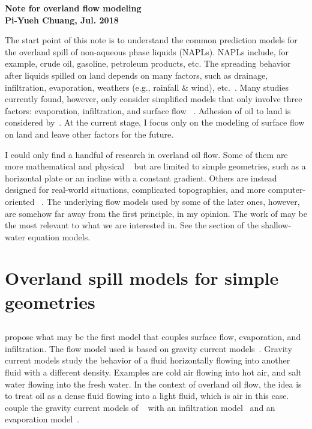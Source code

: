 \documentclass[letterpaper]{article}
\begin{document}
   \noindent           
   {\bf \Large Note for overland flow modeling}\\
   {\bf \normalsize Pi-Yueh Chuang, Jul. 2018}

The start point of this note is to understand the common prediction 
models for the overland spill of non-aqueous phase liquids (NAPLs). 
NAPLs include, for example, crude oil, gasoline, petroleum products, etc. 
The spreading behavior after liquids spilled on land depends on many factors, 
such as drainage, infiltration, evaporation, weathers (e.g., rainfall \& wind), 
etc.\ \cite{Simmons2003}.
Many studies currently found, however, only consider simplified models that only
involve three factors: evaporation, infiltration, and surface flow
\ \cite{Hussein2002, Ronnie2004, Zuczek2008}. 
Adhesion of oil to land is considered by\ \cite{Farrar2005}. 
At the current stage, I focus only on the modeling of surface flow on land and 
leave other factors for the future.

I could only find a handful of research in overland oil flow. 
Some of them are more mathematical and physical 
\ \cite{Hussein2002, Simmons2003, Guo2006} 
but are limited to simple geometries, such as a horizontal plate or an incline 
with a constant gradient. 
Others are instead designed for real-world situations, complicated topographies,
and more computer-oriented
\ \cite{Ronnie2004, Farrar2005, Zuczek2008, Gin2012, Su2017}.
The underlying flow models used by some of the later ones, however, are somehow 
far away from the first principle, in my opinion.
The work of \textcite{Su2017} may be the most relevant to what we are interested 
in. 
See the section of the shallow-water equation models.

\section{Overland spill models for simple geometries}

\subsection{\textcite{Hussein2002}}

\textcite{Hussein2002} propose what may be the first model that couples surface
flow, evaporation, and infiltration. 
The flow model used is based on gravity current models\ \cite{Huppert1982, Lister1992}. 
Gravity current models study the behavior of a fluid horizontally flowing into 
another fluid with a different density. 
Examples are cold air flowing into hot air, and salt water flowing into
the fresh water. 
In the context of overland oil flow, the idea is to treat oil as a dense fluid 
flowing into a light fluid, which is air in this case.
\textcite{Hussein2002} couple the gravity current models of
\ \cite{Huppert1982, Lister1992} with an infiltration model\ \cite{Weaver1994} 
and an evaporation model\ \cite{Stiver1989}.
\end{document}
